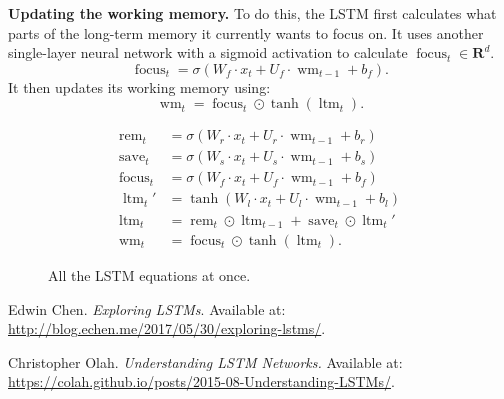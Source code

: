 \documentclass[12pt]{article}
\theoremstyle{definition}
\newcommand{\R}{\ensuremath{\bm{R}}}
\DeclareMathOperator{\rem}{rem}
\DeclareMathOperator{\save}{save}
\DeclareMathOperator{\focus}{focus}
\DeclareMathOperator{\ltm}{ltm}
\DeclareMathOperator{\wm}{wm}
\begin{document}
\medskip
\noindent \textbf{Updating the working memory.} To do this, the LSTM first
calculates what parts of the long-term memory it currently wants to focus on.
It uses another single-layer neural network with a sigmoid activation to
calculate $\focus_{t} \in \R^{d}$.
\begin{equation}
\focus_{t} = \sigma \left ( W_f \cdot x_t + U_f \cdot \wm_{t - 1} + b_f \right ).
\end{equation}
It then updates its working memory using:
\begin{equation}
\wm_{t} = \focus_{t} \odot \tanh(\ltm_{t}).
\end{equation}


\begin{figure}[ht]
\begin{tcolorbox}
\begin{align*}
    \rem_{t}   & = \sigma \left ( W_r \cdot x_t + U_r \cdot \wm_{t - 1} + b_r \right ) \\
    \save_{t}  & = \sigma \left ( W_s \cdot x_t + U_s \cdot \wm_{t - 1} + b_s \right ) \\
    \focus_{t} & = \sigma \left ( W_f \cdot x_t + U_f \cdot \wm_{t - 1} + b_f \right ) \\
    \ltm_{t}'  & = \tanh \left ( W_l \cdot x_t + U_l \cdot \wm_{t - 1} + b_l \right ) \\
    \ltm_{t}   & = \rem_{t} \odot \ltm_{t - 1} + \save_{t} \odot \ltm_{t}' \\
    \wm_{t}    & = \focus_{t} \odot \tanh(\ltm_{t}).
\end{align*}
\end{tcolorbox}
\caption{All the LSTM equations at once.}
\end{figure}



 Edwin Chen. \emph{Exploring LSTMs}. Available at:
\url{http://blog.echen.me/2017/05/30/exploring-lstms/}.

 Christopher Olah. \emph{Understanding LSTM Networks.} Available at:
\url{https://colah.github.io/posts/2015-08-Understanding-LSTMs/}.
\end{document}
